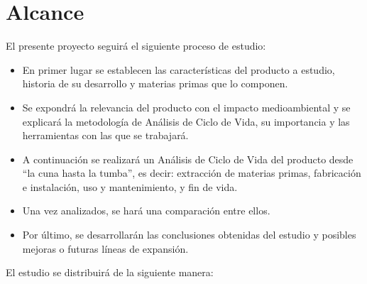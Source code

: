 \chapter{Alcance}\label{cap:alcance}

El presente proyecto seguirá el siguiente proceso de estudio:

\begin{itemize}
  \item En primer lugar se establecen las características del producto a estudio, historia de su desarrollo y materias primas que lo componen.
  \item Se expondrá la relevancia del producto con el impacto medioambiental y se explicará la metodología de Análisis de Ciclo de Vida, su importancia y las herramientas con las que se trabajará.
  \item A continuación se realizará un Análisis de Ciclo de Vida del producto desde ``la cuna hasta la tumba'', es decir: extracción de materias primas, fabricación e instalación, uso y mantenimiento, y fin de vida.
  \item Una vez analizados, se hará una comparación entre ellos.
  \item Por último, se desarrollarán las conclusiones obtenidas del estudio y posibles mejoras o futuras líneas de expansión.
\end{itemize}

El estudio se distribuirá de la siguiente manera:

